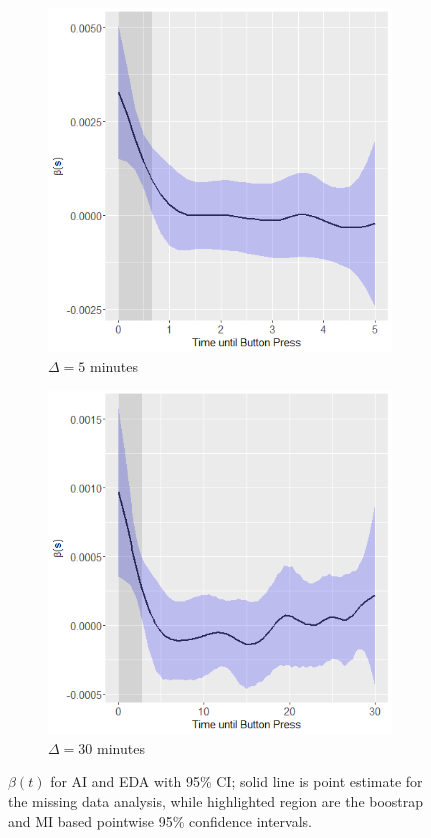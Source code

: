 \documentclass[12pt]{amsart}
\begin{document}
\begin{figure}[!th]
\centering
\begin{subfigure}{.5\textwidth}
  \centering
  \includegraphics[width=.8\linewidth]{../figures/acc_coef_joint_bootstrap_Delta_5.png}
  \caption{$\Delta = 5$ minutes}
  \label{fig:acc_estimate_bs_delta5}
\end{subfigure}%
\begin{subfigure}{.5\textwidth}
  \centering
  \includegraphics[width=.8\linewidth]{../figures/acc_coef_joint_bootstrap_Delta_30.png}
  \caption{$\Delta = 30$ minutes}
  \label{fig:acc_estimate_bs_delta30}
\end{subfigure}
\caption{$\beta (t)$ for AI and EDA with 95\% CI; solid line is point estimate for the missing data analysis, while highlighted region are the boostrap and MI based pointwise 95\% confidence intervals.}
\label{fig:edacc_estimate_bs}
\end{figure}
\end{document}
